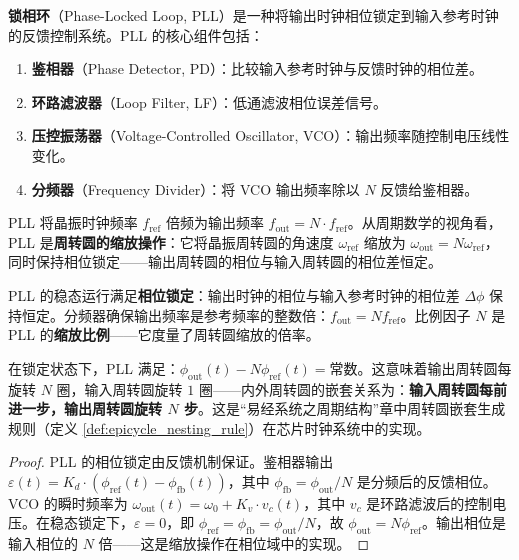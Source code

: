 \begin{definition}[锁相环的周转圆解释]\label{def:pll_epicycle}
\textbf{锁相环}（Phase-Locked Loop, PLL）是一种将输出时钟相位锁定到输入参考时钟的反馈控制系统。PLL 的核心组件包括：
\begin{enumerate}[label=(\roman*)]
    \item \textbf{鉴相器}（Phase Detector, PD）：比较输入参考时钟与反馈时钟的相位差。
    \item \textbf{环路滤波器}（Loop Filter, LF）：低通滤波相位误差信号。
    \item \textbf{压控振荡器}（Voltage-Controlled Oscillator, VCO）：输出频率随控制电压线性变化。
    \item \textbf{分频器}（Frequency Divider）：将 VCO 输出频率除以 $N$ 反馈给鉴相器。
\end{enumerate}
PLL 将晶振时钟频率 $f_{\text{ref}}$ 倍频为输出频率 $f_{\text{out}} = N \cdot f_{\text{ref}}$。从周期数学的视角看，PLL 是\textbf{周转圆的缩放操作}：它将晶振周转圆的角速度 $\omega_{\text{ref}}$ 缩放为 $\omega_{\text{out}} = N\omega_{\text{ref}}$，同时保持相位锁定——输出周转圆的相位与输入周转圆的相位差恒定。
\end{definition}

\begin{proposition}\label{prop:pll_phase_lock}
PLL 的稳态运行满足\textbf{相位锁定}：输出时钟的相位与输入参考时钟的相位差 $\Delta\phi$ 保持恒定。分频器确保输出频率是参考频率的整数倍：$f_{\text{out}} = N f_{\text{ref}}$。比例因子 $N$ 是 PLL 的\textbf{缩放比例}——它度量了周转圆缩放的倍率。

在锁定状态下，PLL 满足：$\phi_{\text{out}}(t) - N\phi_{\text{ref}}(t) = \text{常数}$。这意味着输出周转圆每旋转 $N$ 圈，输入周转圆旋转 $1$ 圈——内外周转圆的嵌套关系为：\textbf{输入周转圆每前进一步，输出周转圆旋转 $N$ 步}。这是“易经系统之周期结构”章中周转圆嵌套生成规则（定义 \ref{def:epicycle_nesting_rule}）在芯片时钟系统中的实现。
\end{proposition}

\begin{proof}
PLL 的相位锁定由反馈机制保证。鉴相器输出 $\varepsilon(t) = K_d \cdot (\phi_{\text{ref}}(t) - \phi_{\text{fb}}(t))$，其中 $\phi_{\text{fb}} = \phi_{\text{out}}/N$ 是分频后的反馈相位。VCO 的瞬时频率为 $\omega_{\text{out}}(t) = \omega_0 + K_v \cdot v_c(t)$，其中 $v_c$ 是环路滤波后的控制电压。在稳态锁定下，$\varepsilon = 0$，即 $\phi_{\text{ref}} = \phi_{\text{fb}} = \phi_{\text{out}}/N$，故 $\phi_{\text{out}} = N\phi_{\text{ref}}$。输出相位是输入相位的 $N$ 倍——这是缩放操作在相位域中的实现。
\end{proof}

